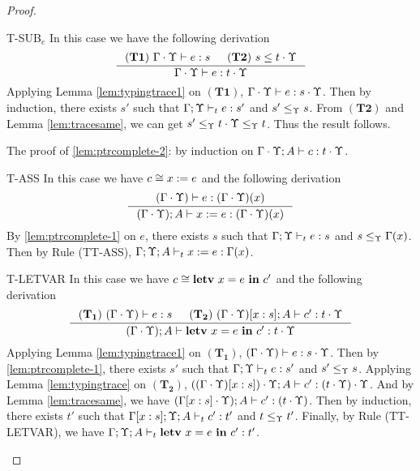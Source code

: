 {{{\begin{proof}
\begin{ProofEnumDesc}
\item[T-SUB$_e$] In this case we have the following derivation
\begin{equation*}
\inference
{(\mathbf{T1})~\Gamma\cdot\trace \vdash e : s & (\mathbf{T2})~s \leq t\cdot\trace}
{\Gamma\cdot\trace \vdash e : t\cdot\trace}
\end{equation*}
Applying Lemma \ref{lem:typingtrace1} on $(\mathbf{T1})$, $\Gamma\cdot\Upsilon \vdash e : s\cdot \Upsilon$.
Then by induction, there exists $s'$ such that $\Gamma;\Upsilon \vdash_{t} e : s'$ and $s' \leq_{\Upsilon} s$.
From $(\mathbf{T2})$ and Lemma \ref{lem:tracesame}, we can get $s'\leq_{\Upsilon} t\cdot\Upsilon \leq_{\Upsilon} t $. Thus the result follows.
\end{ProofEnumDesc}
The proof of \ref{lem:ptrcomplete-2}: by induction on $\Gamma\cdot\Upsilon; A \vdash c : t\cdot \Upsilon $. %
\begin{ProofEnumDesc}
\item[T-ASS] In this case we have $c \cong {x}:={e}$ and the following derivation
\begin{equation*}
\inference
{(\Gamma\cdot\trace) \vdash e : (\Gamma\cdot\trace)(x)}
{(\Gamma\cdot\trace);A \vdash \lcASS{x}{e} : (\Gamma\cdot\trace)(x)}
\end{equation*}
By \ref{lem:ptrcomplete-1} on $e$,  there exists $s$ such that
$\Gamma; \Upsilon \vdash_{t} e : s$ and $s \leq_{\Upsilon} \Gamma(x)$.
Then by Rule {(TT-ASS)},  $\Gamma;\Upsilon; A \vdash_{t} {x}:={e} :\Gamma(x)$.

\item[T-LETVAR]
In this case we have $c \cong {\textbf{letv}~ {x} = {e} ~\textbf{in}~ {c'}}$ and the following derivation
\begin{equation*}
\inference
{(\mathbf{T_1}) ~(\Gamma\cdot\trace) \vdash e : s &
(\mathbf{T_2}) ~(\Gamma\cdot\trace)[x:s]; A \vdash c' : t\cdot\trace }
{(\Gamma\cdot\trace); A\vdash \lcLETVAR{x}{e}{c'} :  t\cdot\trace}
\end{equation*}
Applying Lemma \ref{lem:typingtrace1} on $(\mathbf{T_1})$, $(\Gamma\cdot\Upsilon) \vdash e : s\cdot\Upsilon$.
Then by \ref{lem:ptrcomplete-1},  there exists $s'$ such that $\Gamma;\Upsilon \vdash_{t} e : s'$ and $s' \leq_{\Upsilon} s$.
Applying Lemma \ref{lem:typingtrace} on $(\mathbf{T_2})$, $((\Gamma\cdot\Upsilon)[x:s])\cdot\Upsilon; A \vdash c' : (t\cdot\Upsilon)\cdot\Upsilon$.
And by Lemma \ref{lem:tracesame}, we have $(\Gamma[x:s]\cdot\Upsilon); A \vdash c' : (t\cdot\Upsilon)$.
Then by induction, there exists $t'$ such that $\Gamma[x:s]; \Upsilon; A \vdash_{t} c' : t' $ and $t \leq_{\Upsilon} t'$.
Finally, by Rule {(TT-LETVAR)}, we have $\Gamma; \Upsilon; A \vdash_{t} {\textbf{letv}~ {x} = {e} ~\textbf{in}~ {c'}} : t' $.


\end{ProofEnumDesc}
\end{proof}}}}
